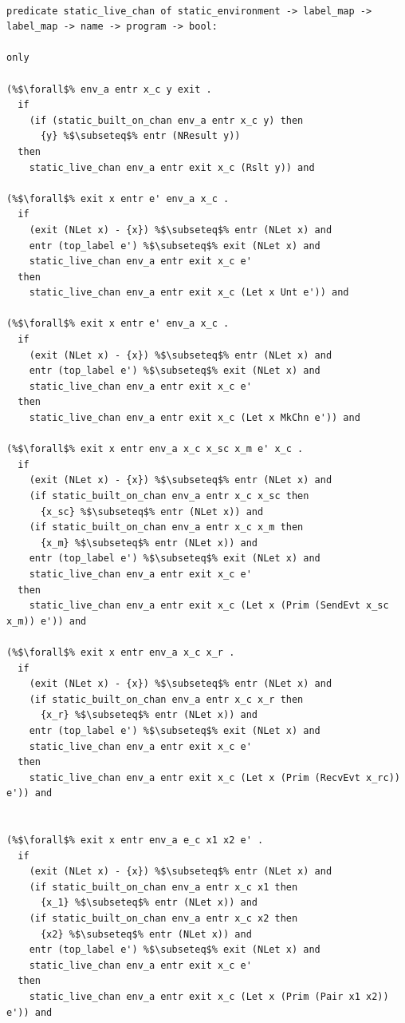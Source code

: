 \documentclass{article}
\begin{document}
\begin{lstlisting}[language=logic, escapechar=\%]

predicate static_live_chan of static_environment -> label_map -> label_map -> name -> program -> bool:
    
only

(%$\forall$% env_a entr x_c y exit .
  if
    (if (static_built_on_chan env_a entr x_c y) then
      {y} %$\subseteq$% entr (NResult y))
  then
    static_live_chan env_a entr exit x_c (Rslt y)) and

(%$\forall$% exit x entr e' env_a x_c .
  if 
    (exit (NLet x) - {x}) %$\subseteq$% entr (NLet x) and
    entr (top_label e') %$\subseteq$% exit (NLet x) and
    static_live_chan env_a entr exit x_c e'
  then 
    static_live_chan env_a entr exit x_c (Let x Unt e')) and

(%$\forall$% exit x entr e' env_a x_c .
  if
    (exit (NLet x) - {x}) %$\subseteq$% entr (NLet x) and
    entr (top_label e') %$\subseteq$% exit (NLet x) and
    static_live_chan env_a entr exit x_c e'
  then 
    static_live_chan env_a entr exit x_c (Let x MkChn e')) and

(%$\forall$% exit x entr env_a x_c x_sc x_m e' x_c .
  if
    (exit (NLet x) - {x}) %$\subseteq$% entr (NLet x) and
    (if static_built_on_chan env_a entr x_c x_sc then
      {x_sc} %$\subseteq$% entr (NLet x)) and
    (if static_built_on_chan env_a entr x_c x_m then 
      {x_m} %$\subseteq$% entr (NLet x)) and
    entr (top_label e') %$\subseteq$% exit (NLet x) and
    static_live_chan env_a entr exit x_c e'
  then
    static_live_chan env_a entr exit x_c (Let x (Prim (SendEvt x_sc x_m)) e')) and

(%$\forall$% exit x entr env_a x_c x_r .    
  if
    (exit (NLet x) - {x}) %$\subseteq$% entr (NLet x) and
    (if static_built_on_chan env_a entr x_c x_r then
      {x_r} %$\subseteq$% entr (NLet x)) and
    entr (top_label e') %$\subseteq$% exit (NLet x) and
    static_live_chan env_a entr exit x_c e'
  then
    static_live_chan env_a entr exit x_c (Let x (Prim (RecvEvt x_rc)) e')) and


(%$\forall$% exit x entr env_a e_c x1 x2 e' .
  if
    (exit (NLet x) - {x}) %$\subseteq$% entr (NLet x) and
    (if static_built_on_chan env_a entr x_c x1 then
      {x_1} %$\subseteq$% entr (NLet x)) and
    (if static_built_on_chan env_a entr x_c x2 then
      {x2} %$\subseteq$% entr (NLet x)) and
    entr (top_label e') %$\subseteq$% exit (NLet x) and
    static_live_chan env_a entr exit x_c e'
  then
    static_live_chan env_a entr exit x_c (Let x (Prim (Pair x1 x2)) e')) and


\end{lstlisting}
\end{document}
